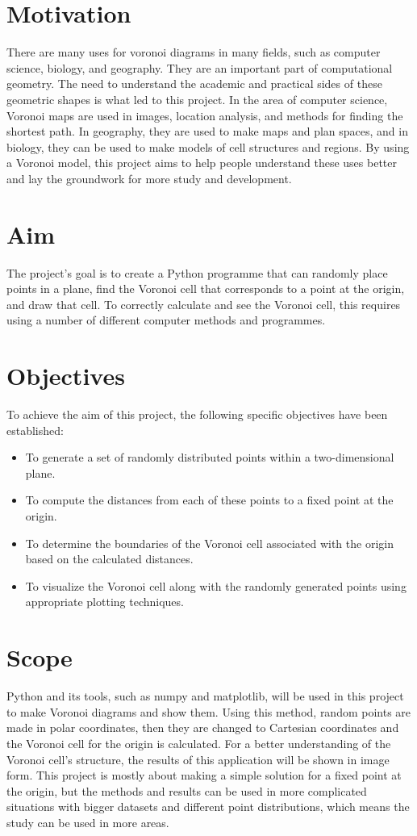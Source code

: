 \documentclass[12pt,a4paper]{report}
\begin{document}
\section{Motivation}
There are many uses for voronoi diagrams in many fields, such as computer science, biology, and geography. They are an important part of computational geometry. The need to understand the academic and practical sides of these geometric shapes is what led to this project. In the area of computer science, Voronoi maps are used in images, location analysis, and methods for finding the shortest path. In geography, they are used to make maps and plan spaces, and in biology, they can be used to make models of cell structures and regions. By using a Voronoi model, this project aims to help people understand these uses better and lay the groundwork for more study and development.

\section{Aim}
The project's goal is to create a Python programme that can randomly place points in a plane, find the Voronoi cell that corresponds to a point at the origin, and draw that cell. To correctly calculate and see the Voronoi cell, this requires using a number of different computer methods and programmes.

\section{Objectives}
To achieve the aim of this project, the following specific objectives have been established:
\begin{itemize}
  \item To generate a set of randomly distributed points within a two-dimensional plane.
  \item To compute the distances from each of these points to a fixed point at the origin.
  \item To determine the boundaries of the Voronoi cell associated with the origin based on the calculated distances.
  \item To visualize the Voronoi cell along with the randomly generated points using appropriate plotting techniques.
\end{itemize}

\section{Scope}
Python and its tools, such as numpy and matplotlib, will be used in this project to make Voronoi diagrams and show them. Using this method, random points are made in polar coordinates, then they are changed to Cartesian coordinates and the Voronoi cell for the origin is calculated. For a better understanding of the Voronoi cell's structure, the results of this application will be shown in image form. This project is mostly about making a simple solution for a fixed point at the origin, but the methods and results can be used in more complicated situations with bigger datasets and different point distributions, which means the study can be used in more areas.
\end{document}
